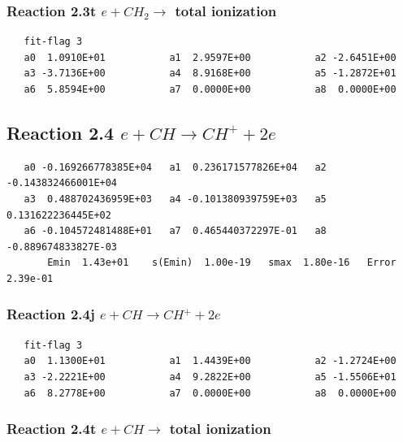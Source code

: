 \documentclass[12pt,dvipdfmx]{article}
\begin{document}
\subsubsection{
Reaction 2.3t      $e + CH_{2} \rightarrow$ total ionization
}

\begin{small}\begin{verbatim}
   fit-flag 3
   a0  1.0910E+01           a1  2.9597E+00           a2 -2.6451E+00
   a3 -3.7136E+00           a4  8.9168E+00           a5 -1.2872E+01
   a6  5.8594E+00           a7  0.0000E+00           a8  0.0000E+00
\end{verbatim}\end{small}


\subsection{
Reaction 2.4      $e + CH \rightarrow  CH^+ + 2e $
}

\begin{small}\begin{verbatim}
   a0 -0.169266778385E+04   a1  0.236171577826E+04   a2 -0.143832466001E+04
   a3  0.488702436959E+03   a4 -0.101380939759E+03   a5  0.131622236445E+02
   a6 -0.104572481488E+01   a7  0.465440372297E-01   a8 -0.889674833827E-03
       Emin  1.43e+01    s(Emin)  1.00e-19   smax  1.80e-16   Error  2.39e-01
 \end{verbatim}\end{small}


\subsubsection{
Reaction 2.4j      $e + CH \rightarrow CH^{+} + 2e $
}

\begin{small}\begin{verbatim}
   fit-flag 3
   a0  1.1300E+01           a1  1.4439E+00           a2 -1.2724E+00
   a3 -2.2221E+00           a4  9.2822E+00           a5 -1.5506E+01
   a6  8.2778E+00           a7  0.0000E+00           a8  0.0000E+00
 \end{verbatim}\end{small}


\subsubsection{
Reaction 2.4t      $e + CH \rightarrow$ total ionization
}
\end{document}
